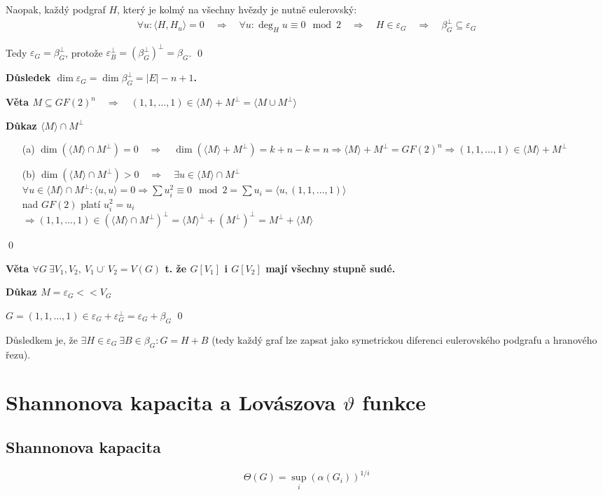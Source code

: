 \documentclass[a4paper,12pt,titlepage]{article}
\newcommand{\shn}{\Theta}
\newcommand{\dk}{\smallskip\noindent\bf Důkaz\rm{} }
\newcommand{\vt}{\smallskip\noindent\bf Věta\rm{} }
\newcommand{\dsl}{\smallskip\noindent\bf Důsledek\rm{} }
\newcommand{\sk}[1]{\langle #1\rangle}
\begin{document}
Naopak, každý podgraf $H$, který je kolmý na všechny hvězdy je nutně eulerovský:
\begin{align*}
\forall u: \sk{H,H_u} = 0 \quad\Rightarrow\quad \forall u: \deg_H u \equiv 0 \mod 2 \quad\Rightarrow\quad H \in \varepsilon_G \quad\Rightarrow\quad \beta_G^\bot \subseteq \varepsilon_G
\end{align*}

Tedy $\varepsilon_G = \beta_G^\bot$, protože $\varepsilon_B^\bot = {\left(\beta_G^\bot\right)}^\bot = \beta_G$.
\qed

\dsl $\dim \varepsilon_G = \dim \beta_G^\bot = |E| - n + 1$.


\vt $M \subseteq GF(2)^n \quad\Rightarrow\quad (1,1,\dots,1) \in \sk M + M^\bot = \sk{M\cup M^\bot}$

\dk $\sk M \cap M^\bot$
\begin{enumerate}
\item[(a)] $\dim(\sk M \cap M^\bot) = 0 \quad\Rightarrow\quad \dim(\sk M + M^\bot) = k+n-k = n \Rightarrow \sk M + M^\bot = GF(2)^n \Rightarrow (1,1,\dots,1)\in \sk M + M^\bot$
\item[(b)] $\dim(\sk M \cap M^\bot) > 0 \quad\Rightarrow\quad \exists u\in \sk M \cap M^\bot$ \\ 
$\forall u\in \sk M \cap M^\bot: \sk{u,u} = 0 \Rightarrow \sum u_i^2 \equiv 0 \mod 2 = \sum u_i = \sk{u, (1,1,\dots,1)}$ \\
nad $GF(2)$ platí $u_i^2 = u_i$ \\
$\Rightarrow (1,1,\dots,1) \in {(\sk M \cap M^\bot)}^\bot = {\sk M}^\bot + {(M^\bot)}^\bot = M^\bot + \sk M$
\end{enumerate}
\qed


\vt $\forall G \ \exists V_1,V_2,\ V_1\cup^\cdot V_2 = V(G)$ t. že $G[V_1]$ i $G[V_2]$ mají všechny stupně sudé.

\dk $M = \varepsilon_G << V_G$

$G = (1,1,\dots,1) \in \varepsilon_G + \varepsilon_G^\bot = \varepsilon_G + \beta_G$
\qed

Důsledkem je, že $\exists H \in \varepsilon_G\ \exists B\in \beta_G: G = H + B$ (tedy každý graf lze zapsat jako symetrickou diferenci eulerovského podgrafu a hranového řezu).


\section{Shannonova kapacita a Lovászova $\vartheta$ funkce}
\subsection{Shannonova kapacita}
$$
	\shn(G) = \sup_i(\alpha(G_i))^{1/i}
$$
\end{document}
